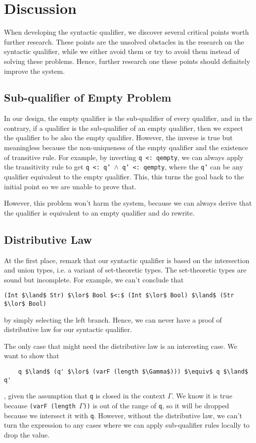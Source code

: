 \section{Discussion} \label{sec:discussion}

When developing the syntactic qualifier, we discover several critical points worth further research. These points are the unsolved obstacles in the research on the syntactic qualifier, while we either avoid them or try to avoid them instead of solving these problems. Hence, further research one these points should definitely improve the system.

\subsection{Sub-qualifier of Empty Problem} \label{sec:subqual-of-empty}
In our design, the empty qualifier is the sub-qualifier of every qualifier, and in the contrary, if a qualifier is the sub-qualifier of an empty qualifier, then we expect the qualifier to be also the empty qualifier. However, the inverse is true but meaningless because the non-uniqueness of the empty qualifier and the existence of transitive rule. For example, by inverting \texttt{q <: qempty}, we can always apply the transitivity rule to get \texttt{q <: q' $\land$ q' <: qempty}, where the \texttt{q'} can be any qualifier equivalent to the empty qualifier. This, this turns the goal back to the initial point so we are unable to prove that.

However, this problem won't harm the system, because we can always derive that the qualifier is equivalent to an empty qualifier and do rewrite. 

\subsection{Distributive Law} \label{sec:distributive}
At the first place, remark that our syntactic qualifier is based on the intersection and union types, i.e. a variant of set-theoretic types. The set-theoretic types are sound but incomplete. For example, we can't conclude that 
\begin{lstlisting}
(Int $\land$ Str) $\lor$ Bool $<:$ (Int $\lor$ Bool) $\land$ (Str $\lor$ Bool)
\end{lstlisting}
by simply selecting the left branch. Hence, we can never have a proof of distributive law for our syntactic qualifier.

The only case that might need the distributive law is an interesting case. We want to show that
\begin{lstlisting}
    q $\land$ (q' $\lor$ (varF (length $\Gamma$))) $\equiv$ q $\land$ q'
\end{lstlisting}
, given the assumption that \texttt{q} is closed in the context \texttt{$\Gamma$}. We know it is true because \texttt{(varF (length $\Gamma$))} is out of the range of \texttt{q}, so it will be dropped because we intersect it with \texttt{q}. However, without the distributive law, we can't turn the expression to any cases where we can apply sub-qualifier rules
locally to drop the value. 


